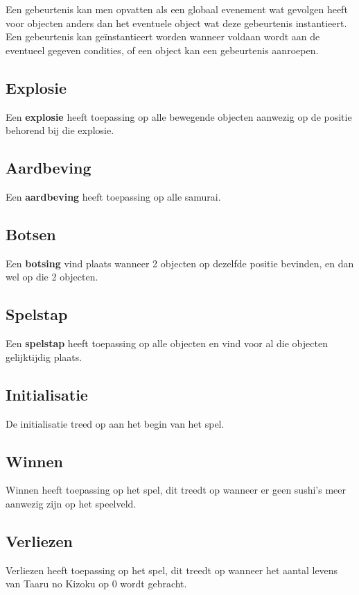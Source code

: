 Een gebeurtenis kan men opvatten als een globaal evenement wat gevolgen heeft voor objecten anders dan het eventuele object wat deze gebeurtenis instantieert.
Een gebeurtenis kan ge\"instantieert worden wanneer voldaan wordt aan de eventueel gegeven condities, of een object kan een gebeurtenis aanroepen.

\subsection{Explosie}
Een \textbf{explosie} heeft toepassing op alle bewegende objecten aanwezig op de positie behorend bij die explosie.

\subsection{Aardbeving}
Een \textbf{aardbeving} heeft toepassing op alle samurai.

\subsection{Botsen}
Een \textbf{botsing} vind plaats wanneer 2 objecten op dezelfde positie bevinden, en dan wel op die 2 objecten.

\subsection{Spelstap}
Een \textbf{spelstap} heeft toepassing op alle objecten en vind voor al die objecten gelijktijdig plaats.

\subsection{Initialisatie}
De initialisatie treed op aan het begin van het spel.

\subsection{Winnen}
Winnen heeft toepassing op het spel, dit treedt op wanneer er geen sushi's meer aanwezig zijn op het speelveld.

\subsection{Verliezen}
Verliezen heeft toepassing op het spel, dit treedt op wanneer het aantal levens van Taaru no Kizoku op 0 wordt gebracht.
